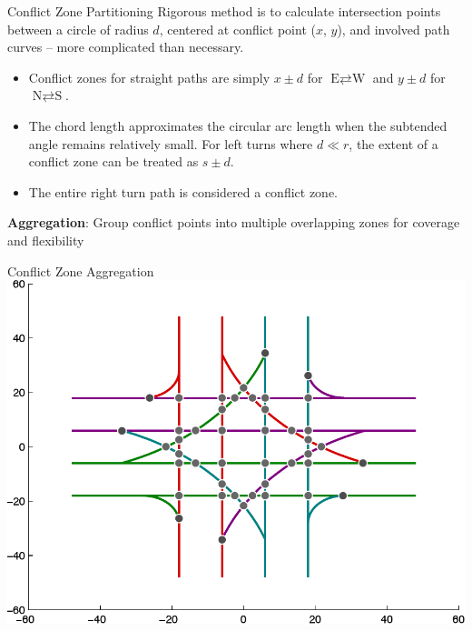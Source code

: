 
\begin{frame}{Conflict Zone Partitioning}
Rigorous method is to calculate intersection points between a circle
of radius $d$, centered at conflict point ($x$, $y$), and involved
path curves -- more complicated than necessary.

\begin{itemize}
\item Conflict zones for straight paths are simply $x \pm d$ for
	$\text{E} \rightleftarrows \text{W}$ and $y \pm d$ for
	$\text{N} \rightleftarrows \text{S}$.
\item The chord length approximates the circular arc length when the
	subtended angle remains relatively small.  For left turns where
	$d \ll r$, the extent of a conflict zone can be treated as $s \pm d$.
\item The entire right turn path is considered a conflict zone.
\end{itemize}
\textbf{Aggregation}: Group conflict points into multiple overlapping zones
	for coverage and flexibility
\end{frame}


\begin{frame}{Conflict Zone Aggregation}
\centering\includegraphics[width=0.8\linewidth]{diagram/intxn_pts.pdf}
\end{frame}


